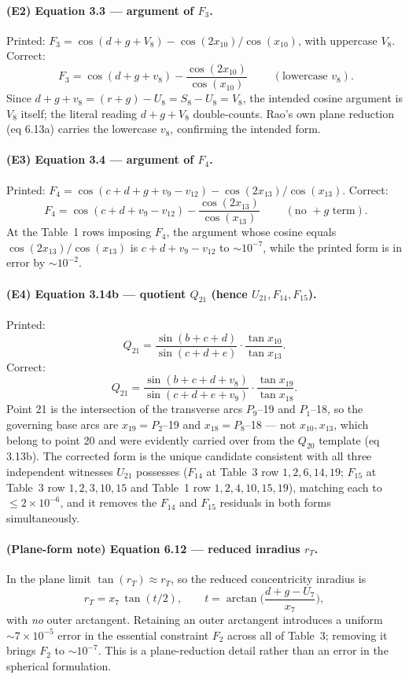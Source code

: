 \documentclass[11pt]{article}
\begin{document}
\paragraph{(E2) Equation 3.3 --- argument of $F_3$.}
Printed: $F_3 = \cos(d+g+V_8) - \cos(2x_{10})/\cos(x_{10})$, with uppercase
$V_8$. Correct:
\[ \boxed{\;F_3 = \cos(d+g+v_8) - \frac{\cos(2x_{10})}{\cos(x_{10})}\;}
\qquad(\text{lowercase }v_8). \]
Since $d+g+v_8 = (r+g) - U_8 = S_8 - U_8 = V_8$, the intended cosine argument is $V_8$ itself; the literal reading $d+g+V_8$ double-counts. Rao's own plane reduction (eq 6.13a) carries the lowercase $v_8$, confirming the intended form.

\paragraph{(E3) Equation 3.4 --- argument of $F_4$.}
Printed: $F_4 = \cos(c+d+g+v_9-v_{12}) - \cos(2x_{13})/\cos(x_{13})$. Correct:
\[ \boxed{\;F_4 = \cos(c+d+v_9-v_{12}) - \frac{\cos(2x_{13})}{\cos(x_{13})}\;}
\qquad(\text{no }+g\text{ term}). \]
At the Table~1 rows imposing $F_4$, the argument whose cosine equals
$\cos(2x_{13})/\cos(x_{13})$ is $c+d+v_9-v_{12}$ to ${\sim}10^{-7}$, while the printed form is in error by ${\sim}10^{-2}$.

\paragraph{(E4) Equation 3.14b --- quotient $Q_{21}$ (hence $U_{21},F_{14},F_{15}$).}
Printed:
\[ Q_{21} = \frac{\sin(b+c+d)}{\sin(c+d+e)}\cdot\frac{\tan x_{10}}{\tan x_{13}}. \]
Correct:
\[ \boxed{\;Q_{21} = \frac{\sin(b+c+d+v_8)}{\sin(c+d+e+v_9)}\cdot
\frac{\tan x_{19}}{\tan x_{18}}.\;} \]
Point 21 is the intersection of the transverse arcs $P_9$--19 and $P_1$--18, so the governing base arcs are $x_{19} = P_2$--19 and $x_{18} = P_8$--18 --- not $x_{10},x_{13}$, which belong to point 20 and were evidently carried over from the $Q_{20}$ template (eq 3.13b). The corrected form is the unique candidate consistent with all three independent witnesses $U_{21}$ possesses ($F_{14}$ at Table~3 row $1,2,6,14,19$; $F_{15}$ at Table~3 row $1,2,3,10,15$ and Table~1 row $1,2,4,10,15,19$), matching each to $\le 2\times10^{-6}$, and it removes the $F_{14}$ and $F_{15}$ residuals in both forms simultaneously.

\paragraph{(Plane-form note) Equation 6.12 --- reduced inradius $r_T$.}
In the plane limit $\tan(r_T)\approx r_T$, so the reduced concentricity inradius
is
\[ r_T = x_7\,\tan(t/2), \qquad t = \arctan\!\Big(\frac{d+g-U_7}{x_7}\Big), \]
with \emph{no} outer arctangent. Retaining an outer arctangent introduces a
uniform ${\sim}7\times10^{-5}$ error in the essential constraint $F_2$ across all of Table~3; removing it brings $F_2$ to ${\sim}10^{-7}$. This is a
plane-reduction detail rather than an error in the spherical formulation.
\end{document}
